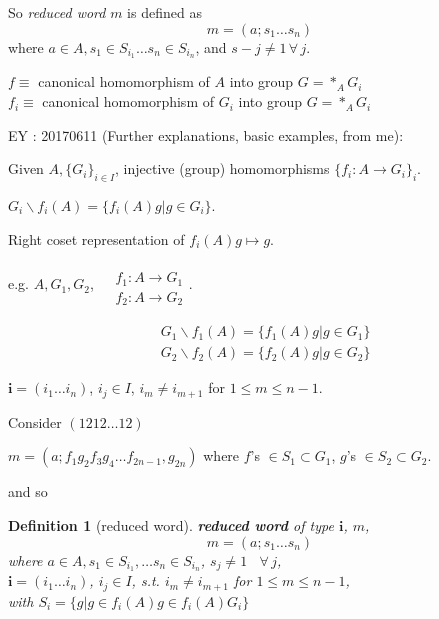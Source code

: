 \documentclass[10pt]{amsart}
\newtheorem{definition}{Definition}
\begin{document}
\begin{multicols*}{2}
So \emph{reduced word} $m$ is defined as 
\[
m = (a;s_1\dots s_n)
\]
where $a\in A, s_1\in S_{i_1} \dots s_n \in S_{i_n}$, and $s-j \neq 1\, \forall \, j$.  

$f\equiv $ canonical homomorphism of $A$ into group $G= *_A G_i$ \\ 
$f_i \equiv $ canonical homomorphism of $G_i$ into group $G= *_A G_i$

EY : 20170611 (Further explanations, basic examples, from me):  

Given $A, \lbrace G_i\rbrace_{i\in I}$, injective (group) homomorphisms $\lbrace f_i: A \to G_i\rbrace_i$.  

$G_i \backslash f_i(A) = \lbrace f_i(A)g | g\in G_i\rbrace$.  

Right coset representation of $f_i(A)g\mapsto g$.  

e.g. $A,G_1,G_2$, $\begin{aligned} & \quad \\
	& f_1:A \to G_1 \\
		& f_2 : A\to G_2 \end{aligned}$.  
		
	\[
	\begin{aligned}
	& G_1\backslash f_1(A) = \lbrace f_1(A)g| g\in G_1\rbrace \\
	& G_2\backslash f_2(A) = \lbrace f_2(A)g | g\in G_2 \rbrace
	\end{aligned}
	\]

$\mathbf{i} = (i_1\dots i_n)$, $i_j\in I$, $i_m\neq i_{m+1}$ for $1\leq m \leq n-1$.  

Consider $(1212\dots 12)$  

$m=(a;f_1 g_2 f_3 g_4 \dots f_{2n-1}, g_{2n})$ where $f$'s $\in S_1 \subset G_1$, $g$'s $\in S_2 \subset G_2$.  

and so 
\begin{definition}[reduced word]
	\textbf{reduced word} of type $\mathbf{i}$, $m$, \begin{equation}
	m=(a;s_1\dots s_n)
	\end{equation}
	where $a\in A, s_1 \in S_{i_1}, \dots s_n \in S_{i_n}$, $s_j\neq 1$ \, $\forall \, j$, \\
	\phantom{where } $\mathbf{i} = (i_1\dots i_n)$, $i_j \in I$, s.t. $i_m \neq i_{m+1}$ for $1\leq m \leq n-1$, \\
	with $S_i = \lbrace g | g\in f_i(A)g \in f_i(A) G_i\rbrace$  
\end{definition}





\end{multicols*}
\end{document}
